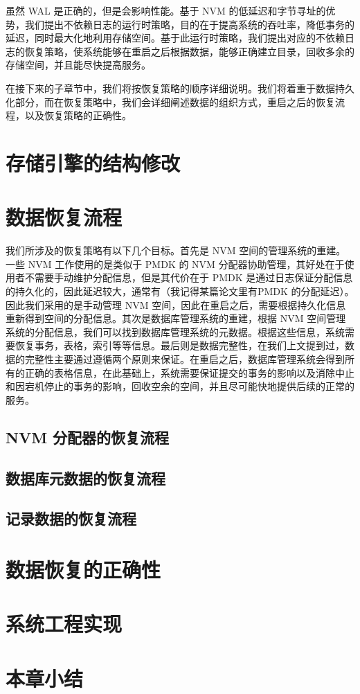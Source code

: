 虽然 WAL 是正确的，但是会影响性能。基于 NVM 的低延迟和字节寻址的优势，我们提出不依赖日志的运行时策略，目的在于提高系统的吞吐率，降低事务的延迟，同时最大化地利用存储空间。基于此运行时策略，我们提出对应的不依赖日志的恢复策略，使系统能够在重启之后根据数据，能够正确建立目录，回收多余的存储空间，并且能尽快提高服务。

在接下来的子章节中，我们将按恢复策略的顺序详细说明。我们将着重于数据持久化部分，而在恢复策略中，我们会详细阐述数据的组织方式，重启之后的恢复流程，以及恢复策略的正确性。

\section{存储引擎的结构修改}

\section{数据恢复流程}

我们所涉及的恢复策略有以下几个目标。首先是 NVM 空间的管理系统的重建。一些 NVM 工作使用的是类似于 PMDK 的 NVM 分配器协助管理，其好处在于使用者不需要手动维护分配信息，但是其代价在于 PMDK 是通过日志保证分配信息的持久化的，因此延迟较大，通常有（我记得某篇论文里有PMDK 的分配延迟）。因此我们采用的是手动管理 NVM 空间，因此在重启之后，需要根据持久化信息重新得到空间的分配信息。其次是数据库管理系统的重建，根据 NVM 空间管理系统的分配信息，我们可以找到数据库管理系统的元数据。根据这些信息，系统需要恢复事务，表格，索引等等信息。最后则是数据完整性，在我们上文提到过，数据的完整性主要通过遵循两个原则来保证。在重启之后，数据库管理系统会得到所有的正确的表格信息，在此基础上，系统需要保证提交的事务的影响以及消除中止和因宕机停止的事务的影响，回收空余的空间，并且尽可能快地提供后续的正常的服务。


\subsection{NVM 分配器的恢复流程}

\subsection{数据库元数据的恢复流程}

\subsection{记录数据的恢复流程}

\section{数据恢复的正确性}


\section{系统工程实现}

\section{本章小结}